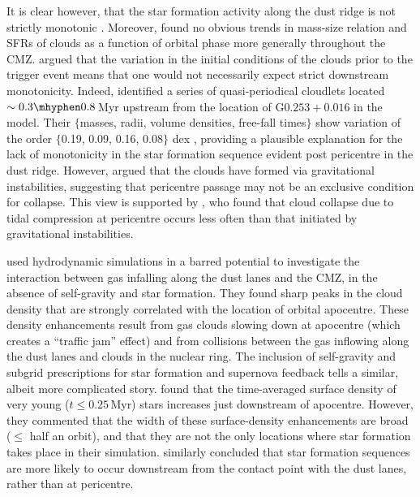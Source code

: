 It is clear however, that the star formation activity along the dust ridge is not strictly monotonic \citep{Walker2018}. Moreover, \citet{Kauffmann2017b} found no obvious trends in mass-size relation and SFRs of clouds as a function of orbital phase more generally throughout the CMZ. 
\citet[][see also \citealp{Kruijssen2017}]{Kruijssen2019} argued that the variation in the initial conditions of the clouds prior to the trigger event means that one would not necessarily expect strict downstream monotonicity.
Indeed, \citet{Henshaw2016a, Henshaw2020} identified a series of quasi-periodical cloudlets located $\sim0.3\mhyphen0.8$\,Myr upstream from the location of G$0.253+0.016$ in the \citet{Kruijssen2015} model.
Their $\{$masses, radii, volume densities, free-fall times$\}$ show variation of the order $\{$0.19, 0.09, 0.16, 0.08$\}$ dex \citep{Henshaw2017, Kruijssen2017}, providing a plausible explanation for the lack of monotonicity in the star formation sequence evident post pericentre in the dust ridge. 
However, \citet{Henshaw2020} argued that the clouds have formed via gravitational instabilities, suggesting that pericentre passage may not be an exclusive condition for collapse. 
This view is supported by \citet{Jeffreson2018a}, who found that cloud collapse due to tidal compression at pericentre occurs less often than that initiated by gravitational instabilities.

\citet{Hatchfield2021} used hydrodynamic simulations in a barred potential to investigate the interaction between gas infalling along the dust lanes and the CMZ, in the absence of self-gravity and star formation. 
They found sharp peaks in the cloud density that are strongly correlated with the location of orbital apocentre.
These density enhancements result from gas clouds slowing down at apocentre (which creates a ``traffic jam'' effect) and from collisions between the gas inflowing along the dust lanes and clouds in the nuclear ring. 
The inclusion of self-gravity and subgrid prescriptions for star formation and supernova feedback tells a similar, albeit more complicated story. 
\citet{Sormani2020b} found that the time-averaged surface density of very young ($t\leq0.25$\,Myr) stars increases just downstream of apocentre. 
However, they commented that the width of these surface-density enhancements are broad ($\leq$ half an orbit), and that they are not the only locations where star formation takes place in their simulation. 
\citet{Armillotta2020} similarly concluded that star formation sequences are more likely to occur downstream from the contact point with the dust lanes, rather than at pericentre. 

